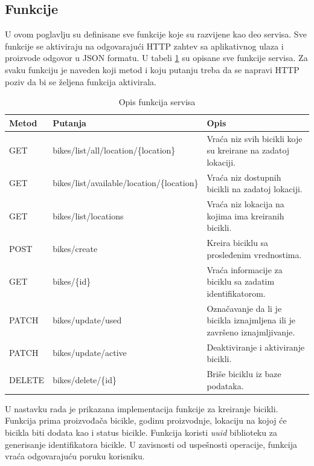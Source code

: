 \documentclass[12pt,oneside]{memoir}
\begin{document}
\subsection{Funkcije}
U ovom poglavlju su definisane sve funkcije koje su razvijene kao deo servisa. Sve funkcije se aktiviraju na odgovarajući HTTP zahtev sa aplikativnog ulaza i proizvode odgovor u JSON formatu. U tabeli \ref{tbl:funkcije} su opisane sve funkcije servisa. Za svaku funkciju je naveden koji metod i koju putanju treba da se napravi HTTP poziv da bi se željena funkcija aktivirala.

\begin{table}
  \centering
  \caption{Opis funkcija servisa}
  \label{tbl:funkcije}
  \begin{tabular}{|p{2cm}|p{7cm}|p{4cm}|} %
    \hline
      Metod& Putanja & Opis \\
    \hline
    GET & bikes/list/all/location/\{location\} & Vraća niz svih bicikli koje su kreirane na zadatoj lokaciji.\\
    \hline
    GET & bikes/list/available/location/\{location\} & Vraća niz dostupnih bicikli na zadatoj lokaciji.\\
    \hline
    GET & bikes/list/locations & Vraća niz lokacija na kojima ima kreiranih bicikli.\\
    \hline
    POST & bikes/create & Kreira biciklu sa prosleđenim vrednostima.\\
    \hline
    GET & bikes/\{id\} & Vraća informacije za biciklu sa zadatim identifikatorom.\\
    \hline
    PATCH & bikes/update/used & Označavanje da li je bicikla iznajmljena ili je završeno iznajmljivanje.\\
    \hline
    PATCH & bikes/update/active & Deaktiviranje i aktiviranje bicikli. \\
    \hline
    DELETE & bikes/delete/\{id\} & Briše biciklu iz baze podataka.\\
    \hline
  \end{tabular}
\end{table}

U nastavku rada je prikazana implementacija funkcije za kreiranje bicikli. Funkcija prima proizvođača bicikle, godinu proizvodnje, lokaciju na kojoj će bicikla biti dodata kao i status bicikle. Funkcija koristi \emph{uuid} biblioteku za generisanje identifikatora bicikle. U zavisnosti od uspešnosti operacije, funkcija vraća odgovarajuću poruku korisniku.
\end{document}
